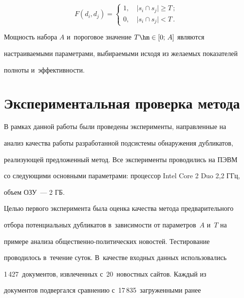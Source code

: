 \vspace*{2pt}



\noindent

  $$

  F\left(d_i,d_j\right) =\begin{cases}

  1, &\ \vert s_i\cap s_j\vert \geq T\,;\\

  0, &\ \vert s_i\cap s_j \vert <T\,.

  \end{cases}

  $$



  Мощность набора $A$ и~пороговое значение $T\hm\in [0;\,A]$ являются

настраиваемыми параметрами, выбираемыми исходя из желаемых показателей

полноты и~эффективности.





\section{Экспериментальная проверка метода}



  В рамках данной работы были проведены эксперименты, направленные на

анализ качества работы разработанной подсистемы обнаружения дубликатов,

реализующей предложенный метод. Все эксперименты проводились на ПЭВМ

со следующими основными параметрами: процессор Intel Core 2 Duo 2,2 ГГц,

объем ОЗУ~--- 2 ГБ.



  Целью первого эксперимента была оценка качества метода предварительного

отбора потенциальных дубликатов в~зависимости от параметров~$A$ и~$T$ на

примере анализа общественно-политических новостей. Тестирование

проводилось в~течение суток. В~качестве входных данных использовались

1\,427~документов, извлеченных с~20~новостных сайтов. Каждый из

документов подвергался сравнению с~17\,835~загруженными ранее

